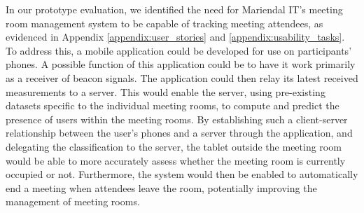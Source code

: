 In our prototype evaluation, we identified the need for Mariendal IT's meeting room management system to be capable of tracking meeting attendees, as evidenced in Appendix \ref{appendix:user_stories} and \ref{appendix:usability_tasks}. 
To address this, a mobile application could be developed for use on participants' phones.
A possible function of this application could be to have it work primarily as a receiver of beacon signals.
The application could then relay its latest received measurements to a server. 
This would enable the server, using pre-existing datasets specific to the individual meeting rooms, to compute and predict the presence of users within the meeting rooms. 
By establishing such a client-server relationship between the user's phones and a server through the application, and delegating the classification to the server, the tablet outside the meeting room would be able to more accurately assess whether the meeting room is currently occupied or not.
Furthermore, the system would then be enabled to automatically end a meeting when attendees leave the room, potentially improving the management of meeting rooms.

